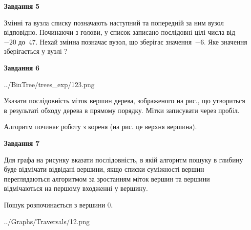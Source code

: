 \documentclass[12pt, ukrainian]{article}
\begin{document}
{\begin {large}
{\begin {center}\textbf{Завдання 5}\end {center}}\par
Змінні  та  вузла списку позначають наступний та попередній за ним вузол відповідно. Починаючи з голови, у список записано послідовні цілі числа від~$-20$ до~$47$. Нехай змінна  позначає вузол, що зберігає значення~$-6$.
Яке значення зберігається у вузлі  ?\par
\newpage

{\begin {center}\textbf{Завдання 6}\end {center}}\par

\begin{center}
	{../BinTree/trees_exp/123.png}
\end{center}
Указати послідовність міток вершин дерева, зображеного на рис., що утвориться в результаті обходу дерева в прямому порядку. Мітки записувати через пробіл.\par Алгоритм починає роботу з кореня (на рис. це верхня вершина).\par
\newpage

{\begin {center}\textbf{Завдання 7}\end {center}}\par
Для графа на рисунку вказати послідовність, в якій алгоритм пошуку в глибину буде відмічати відвідані вершини, якщо списки суміжності вершин переглядаються алгоритмом за зростанням міток вершин та вершини відмічаються на першому вход\-женні у вершину.\par
Пошук розпочинається з вершини 0.\par

\begin{center}
	{../Graphs/Traversals/12.png}
\end{center}\par
\newpage


\end{large}}
\end{document}

